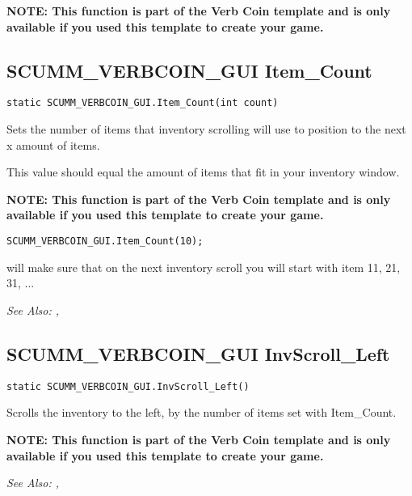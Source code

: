 \bf{NOTE:} This function is part of the Verb Coin template and is only available if
you used this template to create your game.


\subsection{SCUMM_VERBCOIN_GUI Item_Count}\label{SCUMM_VERBCOIN_GUI.Item_Count}%

\begin{verbatim}
static SCUMM_VERBCOIN_GUI.Item_Count(int count)
\end{verbatim}
Sets the number of items that inventory scrolling will use to position to the next x amount of items.

This value should equal the amount of items that fit in your inventory window.

\bf{NOTE:} This function is part of the Verb Coin template and is only available if
you used this template to create your game.

\begin{verbatim}
SCUMM_VERBCOIN_GUI.Item_Count(10);
\end{verbatim}

will make sure that on the next inventory scroll you will start with item 11, 21, 31, ...

\it{See Also:} ,


\subsection{SCUMM_VERBCOIN_GUI InvScroll_Left}\label{SCUMM_VERBCOIN_GUI.InvScroll_Left}%

\begin{verbatim}
static SCUMM_VERBCOIN_GUI.InvScroll_Left()
\end{verbatim}
Scrolls the inventory to the left, by the number of items set with Item_Count.

\bf{NOTE:} This function is part of the Verb Coin template and is only available if
you used this template to create your game.


\it{See Also:} ,


